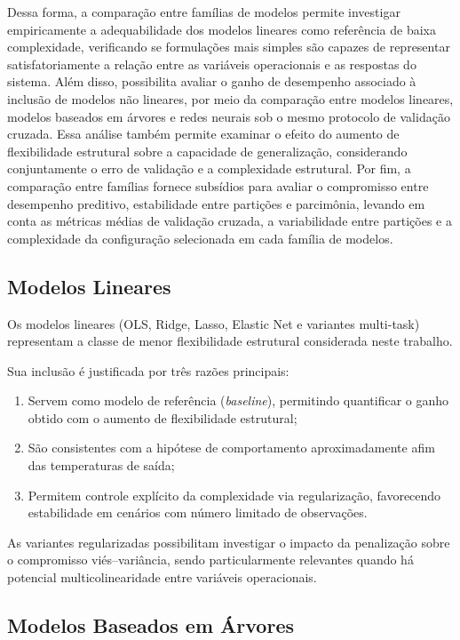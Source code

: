 Dessa forma, a comparação entre famílias de modelos permite investigar empiricamente a adequabilidade dos modelos lineares como referência de baixa complexidade, verificando se formulações mais simples são capazes de representar satisfatoriamente a relação entre as variáveis operacionais e as respostas do sistema. Além disso, possibilita avaliar o ganho de desempenho associado à inclusão de modelos não lineares, por meio da comparação entre modelos lineares, modelos baseados em árvores e redes neurais sob o mesmo protocolo de validação cruzada. Essa análise também permite examinar o efeito do aumento de flexibilidade estrutural sobre a capacidade de generalização, considerando conjuntamente o erro de validação e a complexidade estrutural. Por fim, a comparação entre famílias fornece subsídios para avaliar o compromisso entre desempenho preditivo, estabilidade entre partições e parcimônia, levando em conta as métricas médias de validação cruzada, a variabilidade entre partições e a complexidade da configuração selecionada em cada família de modelos.

\subsection{Modelos Lineares}

Os modelos lineares (OLS, Ridge, Lasso, Elastic Net e variantes multi-task) representam a classe de menor flexibilidade estrutural considerada neste trabalho.

Sua inclusão é justificada por três razões principais:

\begin{enumerate}
    \item Servem como modelo de referência (\emph{baseline}), permitindo quantificar o ganho obtido com o aumento de flexibilidade estrutural;
    \item São consistentes com a hipótese de comportamento aproximadamente afim das temperaturas de saída;
    \item Permitem controle explícito da complexidade via regularização, favorecendo estabilidade em cenários com número limitado de observações.
\end{enumerate}

As variantes regularizadas possibilitam investigar o impacto da penalização sobre o compromisso viés--variância, sendo particularmente relevantes quando há potencial multicolinearidade entre variáveis operacionais.

\subsection{Modelos Baseados em Árvores}

